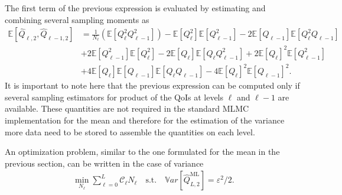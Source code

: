 The first term of the previous expression is evaluated by estimating and combining several sampling moments as
\begin{equation}
\begin{split}
 \mathbb{E}\left[ \hat{Q}_{\ell,2},\hat{Q}_{\ell-1,2} \right] &= \frac{1}{N_\ell} \left( \mathbb{E}\left[ Q_\ell^2 Q_{\ell-1}^2 \right] \right) - \mathbb{E}\left[ Q_\ell^2 \right] \mathbb{E}\left[Q_{\ell-1}^2 \right] - 2 \mathbb{E}\left[Q_{\ell-1} \right] \mathbb{E}\left[ Q_{\ell}^2 Q_{\ell-1} \right] \\
                                      &+ 2 \mathbb{E}\left[Q_{\ell-1}^2 \right] \mathbb{E}\left[ Q_{\ell}^2 \right]
                                      - 2  \mathbb{E}\left[ Q_{\ell} \right] \mathbb{E}\left[ Q_{\ell} Q_{\ell-1}^2 \right]
                                      + 2 \mathbb{E}\left[ Q_{\ell} \right]^2 \mathbb{E}\left[ Q_{\ell-1}^2 \right] \\
                                      &+ 4 \mathbb{E}\left[ Q_{\ell} \right] \mathbb{E}\left[ Q_{\ell-1} \right] \mathbb{E}\left[ Q_{\ell} Q_{\ell-1} \right]
                                      - 4 \mathbb{E}\left[ Q_{\ell} \right]^2 \mathbb{E}\left[ Q_{\ell-1} \right]^2.
\end{split}
\end{equation}
It is important to note here that the previous expression can be computed only if several sampling estimators for product of the QoIs at levels $\ell$ and $\ell-1$ are available.
These quantities are not required in the standard MLMC implementation for the mean and therefore for the estimation of the variance more data need to be stored to assemble the
quantities on each level.

An optimization problem, similar to the one formulated for the mean in the previous section, can be written in the case of variance 
\begin{equation}\label{EQ:mlmc_optimization_var}
\begin{split}
\min\limits_{N_\ell} \sum_{\ell=0}^L \mathcal{C}_{\ell} N_\ell \quad \mathrm{s.t.} \quad \mathbb{V}ar\left[ \hat{Q}_{L,2}^{\mathrm{ML}} \right] = \varepsilon^2/2.
% 
% 
\end{split}
\end{equation}

